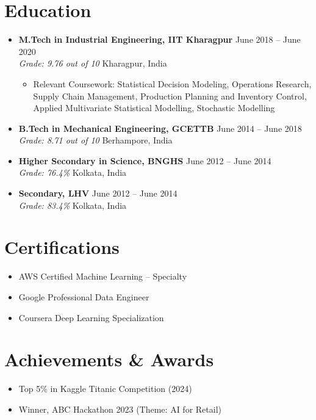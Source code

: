 \documentclass[a4paper,10pt]{article}
\newcommand{\resumeItem}[1]{\item\small{#1}}
\newcommand{\resumeSubheading}[4]{
  \vspace{1pt}\item
    \textbf{#1} \hfill {#2} \\
    \emph{#3} \hfill {#4} \\
}
\begin{document}
\section*{Education}
\begin{itemize}
  \resumeSubheading
    {M.Tech in Industrial Engineering, IIT Kharagpur}{June 2018 -- June 2020}
    {Grade: 9.76 out of 10}{Kharagpur, India}
    \begin{itemize}
      \resumeItem{
        Relevant Coursework: Statistical Decision Modeling, Operations Research, Supply Chain Management, Production Planning and Inventory Control, 
        Applied Multivariate Statistical Modelling, Stochastic Modelling
      }
    \end{itemize}
\end{itemize}
\begin{itemize}
  \resumeSubheading
    {B.Tech in Mechanical Engineering, GCETTB}{June 2014 -- June 2018}
    {Grade: 8.71 out of 10}{Berhampore, India}
\end{itemize}
\begin{itemize}
  \resumeSubheading
    {Higher Secondary in Science, BNGHS}{June 2012 -- June 2014}
    {Grade: 76.4\%}{Kolkata, India}
\end{itemize}
\begin{itemize}
  \resumeSubheading
    {Secondary, LHV}{June 2012 -- June 2014}
    {Grade: 83.4\%}{Kolkata, India}
\end{itemize}

\section*{Certifications}
\begin{itemize}
    \item AWS Certified Machine Learning – Specialty
    \item Google Professional Data Engineer
    \item Coursera Deep Learning Specialization
\end{itemize}

\section*{Achievements \& Awards}
\begin{itemize}
    \item Top 5\% in Kaggle Titanic Competition (2024)
    \item Winner, ABC Hackathon 2023 (Theme: AI for Retail)
\end{itemize}
\end{document}
